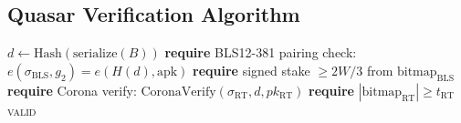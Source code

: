 \subsection{Quasar Verification Algorithm}

\begin{algorithm}[H]
\caption{Quasar Hybrid Finality Verification}
\begin{algorithmic}[1]
    \State $d \gets \text{Hash}(\text{serialize}(B))$
        \State \textbf{require} BLS12-381 pairing check: $e(\sigma_{\text{BLS}}, g_2) = e(H(d), \text{apk})$
        \State \textbf{require} signed stake $\geq 2W/3$ from $\text{bitmap}_{\text{BLS}}$
    \EndIf
        \State \textbf{require} Corona verify: $\text{CoronaVerify}(\sigma_{\text{RT}}, d, pk_{\text{RT}})$
        \State \textbf{require} $|\text{bitmap}_{\text{RT}}| \geq t_{\text{RT}}$
    \EndIf
    \State \Return \textsc{valid}
\EndFunction
\end{algorithmic}
\end{algorithm}

